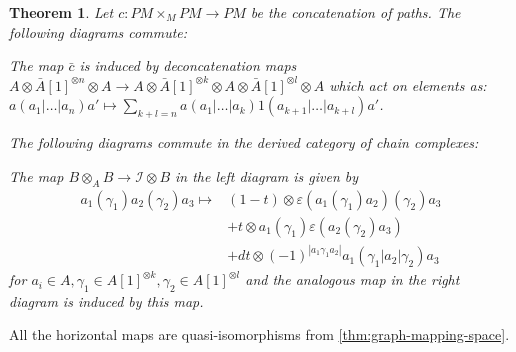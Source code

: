 \documentclass{scrartcl}
\theoremstyle{plain}
\newtheorem{theorem}{Theorem}[section]
\theoremstyle{definition}
\newcommand{\abs}[1]{\left\lvert#1\right\rvert}
\DeclareMathOperator{\Map}{Map}
\begin{document}
\begin{theorem}\label{thm:path-models-1}
    Let $c\colon PM\times_M PM\to PM$ be the concatenation of paths. The following diagrams commute:

    \begin{center}
    \qquad
    \end{center}
    The map $\bar c$ is induced by deconcatenation maps $A\otimes \bar A[1]^{\otimes n}\otimes A \to A\otimes \bar A[1]^{\otimes k} \otimes A \otimes \bar A[1]^{\otimes l} \otimes A$ which act on elements as: $a(a_1|\dots|a_n)a'\mapsto \sum_{k+l=n} a(a_1|\dots|a_k) 1 (a_{k+1}|\dots|a_{k+l}) a'$.

    The following diagrams commute in the derived category of chain complexes:

    \qquad

    The map $B\otimes_A B\to \mathcal I\otimes B$ in the left diagram is given by 
    \begin{align*}
        a_1(\gamma_1)a_2(\gamma_2)a_3 \mapsto &(1-t)\otimes \varepsilon(a_1(\gamma_1)a_2)(\gamma_2)a_3 \\&+ t\otimes a_1(\gamma_1)\varepsilon(a_2(\gamma_2)a_3) \\&+ dt\otimes (-1)^{\abs{a_1\gamma_1a_2}}a_1(\gamma_1|a_2|\gamma_2)a_3
    \end{align*}
    for $a_i\in A, \gamma_1\in A[1]^{\otimes k}, \gamma_2\in A[1]^{\otimes l}$ and the analogous map in the right diagram is induced by this map.
\end{theorem}
All the horizontal maps are quasi-isomorphisms from \cref{thm:graph-mapping-space}.
\end{document}

